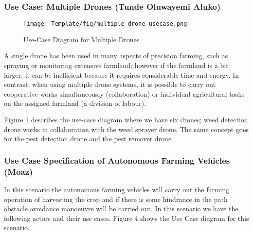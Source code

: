 \documentclass[english]{lni}
\begin{document}
\subsubsection{Use Case: Multiple Drones (Tunde Oluwayemi Aluko)}
\begin{figure}[htp]
    \centering
    \texttt{[image: Template/fig/multiple\_drone\_usecase.png]}
    \caption{Use-Case Diagram for Multiple Drones}
    \label{fig:multilpe_drones}
\end{figure}

A single drone has been used in many aspects of precision farming,
such as spraying or monitoring extensive farmland; however if the farmland is a bit larger, it can be inefficient because it requires considerable time and energy. In contrast,
when using multiple drone systems, it is possible to carry out cooperative
works simultaneously (collaboration) or individual agricultural tasks on the assigned farmland (a division of labour).

Figure \ref{fig:multilpe_drones} describes the use-case diagram where we have six drones; weed detection drone works in collaboration with the weed sprayer drone. The same concept goes for the pest detection drone and the pest remover drone.

\subsubsection{Use Case Specification of Autonomous Farming Vehicles (Moaz)}
In this scenario the autonomous farming vehicles will carry out the farming operation of harvesting the crop and if there is some hindrance in the path obstacle avoidance manoeuvre will be carried out. In this scenario we have the following actors and their use cases. Figure 4 shows the Use Case diagram for this scenario. 
\end{document}
